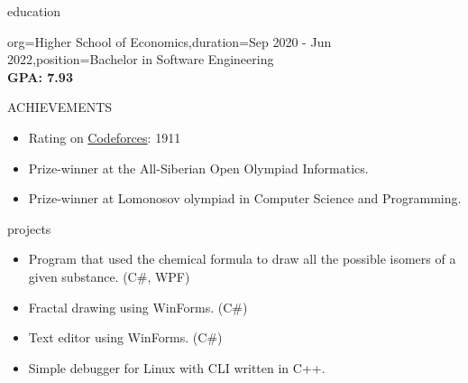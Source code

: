 \documentclass{resume}
\begin{document}
\begin{ResumeSection}{education}
    \begin{ResumeSubsection}{org={Higher School of Economics},duration={Sep 2020 - Jun 2022},position={Bachelor in Software Engineering}}
        \\\bf GPA: 7.93 
    \end{ResumeSubsection}
\end{ResumeSection}

\begin{ResumeSection}{ACHIEVEMENTS}
    \begin{itemize}
        \item Rating on \href{https://codeforces.com/profile/nikita4109}{Codeforces}: 1911
        \item Prize-winner at the All-Siberian Open Olympiad Informatics. 
        \item Prize-winner at Lomonosov olympiad in Computer Science and Programming.
    \end{itemize}
\end{ResumeSection}

\begin{ResumeSection}{projects}
    \begin{itemize}
        \item {
            Program that used the chemical formula to draw all the possible isomers of a given substance. (C\#, WPF)
        }
    \end{itemize}
    \begin{itemize}
        \item {
            Fractal drawing using WinForms. (C\#)
        }
    \end{itemize}
    \begin{itemize}
        \item { 
            Text editor using WinForms. (C\#)
        }
    \end{itemize}
    \begin{itemize}
        \item {
            Simple debugger for Linux with CLI written in C++.
        }
    \end{itemize}
\end{ResumeSection}
\end{document}
